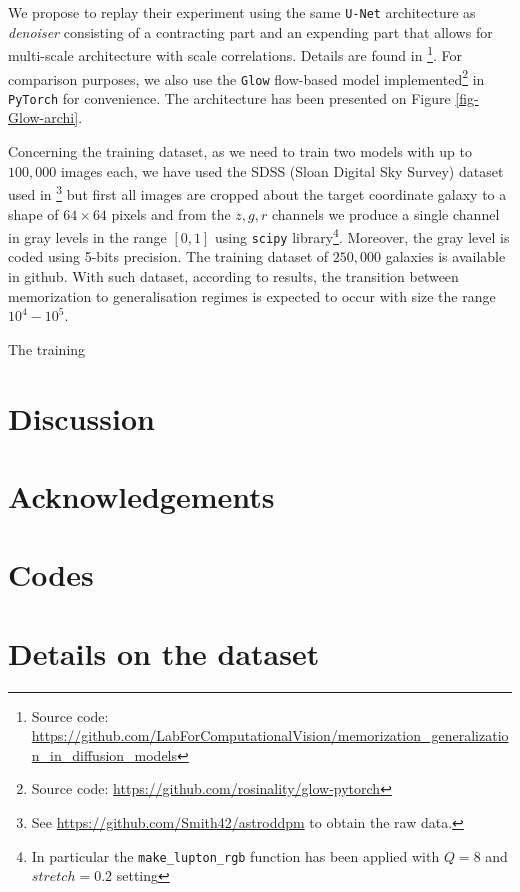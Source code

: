 \documentclass[11pt]{amsart}
\begin{document}
We propose to replay their experiment using the same \texttt{U-Net} architecture \citep{2015arXiv150504597R}  as \textit{denoiser} consisting of a contracting part and an expending part that allows for multi-scale architecture with scale correlations. Details are found in \cite{kadkhodaie2024generalization}\footnote{Source code:  \url{https://github.com/LabForComputationalVision/memorization_generalization_in_diffusion_models}}. For comparison purposes, we also use the \texttt{Glow} flow-based model implemented\footnote{Source code: \url{https://github.com/rosinality/glow-pytorch}} in \texttt{PyTorch}  \citep{PyTorch2019} for convenience. The architecture has been presented on Figure \ref{fig-Glow-archi}.

Concerning the training dataset, as we need to train two models with up to $100,000$ images each, we have used the SDSS (Sloan Digital Sky Survey) dataset used in \citep{smith2021}\footnote{See \url{https://github.com/Smith42/astroddpm} to obtain the raw data.} but first all images are cropped about the target coordinate galaxy to a shape of $64\times 64$ pixels and from the $z,g,r$ channels we produce a single  channel in gray levels in the range $[0,1]$ using \texttt{scipy} \citep{2020SciPy-NMeth} library\footnote{In particular the \texttt{make\_lupton\_rgb} function has been applied with $Q=8$ and $stretch=0.2$ setting}. Moreover, the gray level is coded using 5-bits precision.
{\color{red}The training dataset of $250,000$ galaxies is available in github}. With such dataset,  according to \cite{kadkhodaie2024generalization} results, the transition between memorization to generalisation regimes is expected to occur with size the range $10^4-10^5$. 

The training 



\section{Discussion}


\section*{Acknowledgements}

\section*{Codes}


\appendix
\section{Details on the dataset}
\end{document}
